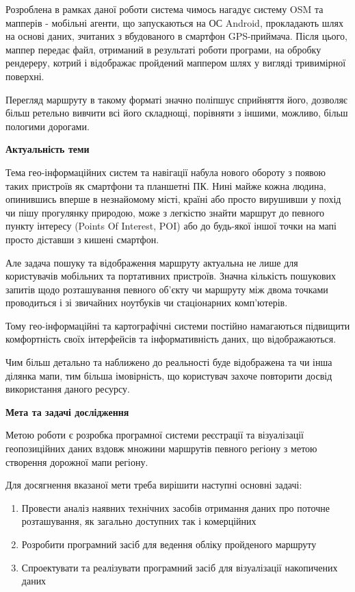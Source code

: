 \documentclass[simple,a4paper,14pt,ukrainian,utf8]{eskdtext}
\begin{document}
    Розроблена в рамках даної роботи система чимось нагадує систему OSM та мапперів - мобільні агенти, що запускаються на ОС Android, прокладають шлях на основі даних, зчитаних з вбудованого в смартфон GPS-приймача\cite{website:gps_receiver}. Після цього, маппер передає файл, отриманий в результаті роботи програми, на обробку рендереру, котрий і відображає пройдений маппером шлях у вигляді тривимірної поверхні.
    
    Перегляд маршруту в такому форматі значно поліпшує сприйняття його, дозволяє більш ретельно вивчити всі його складнощі, порівняти з іншими, можливо, більш пологими дорогами.
    
    \textbf{Актуальність теми}
    
    Тема гео-інформаційних систем та навігації набула нового обороту з появою таких пристроїв як смартфони та планшетні ПК. Нині майже кожна людина, опинившись вперше в незнайомому місті, країні або просто вирушивши у похід чи пішу прогулянку природою, може з легкістю знайти маршрут до певного пункту інтересу (Points Of Interest, POI) або до будь-якої іншої точки на мапі просто діставши з кишені смартфон.

	Але задача пошуку та відображення маршруту актуальна не лише для користувачів мобільних та портативних пристроїв. Значна кількість пошукових запитів щодо розташування певного об’єкту чи маршруту між двома точками проводиться і зі звичайних ноутбуків чи стаціонарних комп’ютерів.

	Тому гео-інформаційні та картографічні системи постійно намагаються підвищити комфортність своїх інтерфейсів та інформативність даних, що відображаються.

	Чим більш детально та наближено до реальності буде відображена та чи інша ділянка мапи, тим більша імовірність, що користувач захоче повторити досвід використання даного ресурсу.

	\textbf{Мета та задачі дослідження}
		
	Метою роботи є розробка програмної системи реєстрації та візуалізації геопозиційних даних вздовж множини маршрутів певного регіону з метою створення дорожної мапи регіону.

	Для досягнення вказаної мети треба вирішити наступні основні задачі:
		
	\begin{enumerate}
		\item Провести аналіз наявних технічних засобів отримання даних про поточне розташування, як загально доступних так і комерційних
		\item Розробити програмний засіб для ведення обліку пройденого маршруту
		\item Спроектувати та реалізувати програмний засіб для візуалізації накопичених даних
	\end{enumerate}
	
\end{document}

